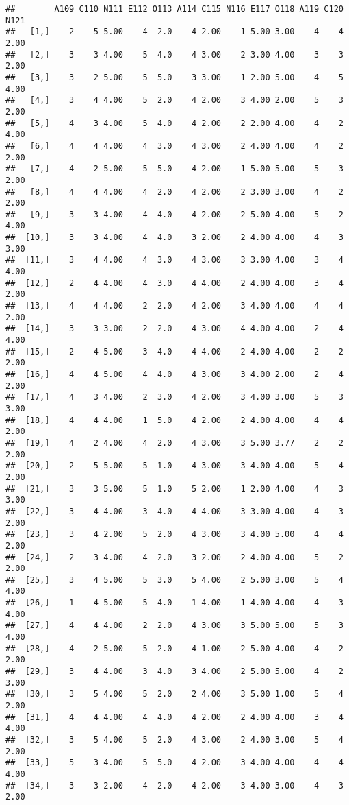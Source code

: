 \documentclass[]{article}
\begin{document}
\begin{verbatim}
##        A109 C110 N111 E112 O113 A114 C115 N116 E117 O118 A119 C120 N121
##   [1,]    2    5 5.00    4  2.0    4 2.00    1 5.00 3.00    4    4 2.00
##   [2,]    3    3 4.00    5  4.0    4 3.00    2 3.00 4.00    3    3 2.00
##   [3,]    3    2 5.00    5  5.0    3 3.00    1 2.00 5.00    4    5 4.00
##   [4,]    3    4 4.00    5  2.0    4 2.00    3 4.00 2.00    5    3 2.00
##   [5,]    4    3 4.00    5  4.0    4 2.00    2 2.00 4.00    4    2 4.00
##   [6,]    4    4 4.00    4  3.0    4 3.00    2 4.00 4.00    4    2 2.00
##   [7,]    4    2 5.00    5  5.0    4 2.00    1 5.00 5.00    5    3 2.00
##   [8,]    4    4 4.00    4  2.0    4 2.00    2 3.00 3.00    4    2 2.00
##   [9,]    3    3 4.00    4  4.0    4 2.00    2 5.00 4.00    5    2 4.00
##  [10,]    3    3 4.00    4  4.0    3 2.00    2 4.00 4.00    4    3 3.00
##  [11,]    3    4 4.00    4  3.0    4 3.00    3 3.00 4.00    3    4 4.00
##  [12,]    2    4 4.00    4  3.0    4 4.00    2 4.00 4.00    3    4 2.00
##  [13,]    4    4 4.00    2  2.0    4 2.00    3 4.00 4.00    4    4 2.00
##  [14,]    3    3 3.00    2  2.0    4 3.00    4 4.00 4.00    2    4 4.00
##  [15,]    2    4 5.00    3  4.0    4 4.00    2 4.00 4.00    2    2 2.00
##  [16,]    4    4 5.00    4  4.0    4 3.00    3 4.00 2.00    2    4 2.00
##  [17,]    4    3 4.00    2  3.0    4 2.00    3 4.00 3.00    5    3 3.00
##  [18,]    4    4 4.00    1  5.0    4 2.00    2 4.00 4.00    4    4 2.00
##  [19,]    4    2 4.00    4  2.0    4 3.00    3 5.00 3.77    2    2 2.00
##  [20,]    2    5 5.00    5  1.0    4 3.00    3 4.00 4.00    5    4 2.00
##  [21,]    3    3 5.00    5  1.0    5 2.00    1 2.00 4.00    4    3 3.00
##  [22,]    3    4 4.00    3  4.0    4 4.00    3 3.00 4.00    4    3 2.00
##  [23,]    3    4 2.00    5  2.0    4 3.00    3 4.00 5.00    4    4 2.00
##  [24,]    2    3 4.00    4  2.0    3 2.00    2 4.00 4.00    5    2 2.00
##  [25,]    3    4 5.00    5  3.0    5 4.00    2 5.00 3.00    5    4 4.00
##  [26,]    1    4 5.00    5  4.0    1 4.00    1 4.00 4.00    4    3 4.00
##  [27,]    4    4 4.00    2  2.0    4 3.00    3 5.00 5.00    5    3 4.00
##  [28,]    4    2 5.00    5  2.0    4 1.00    2 5.00 4.00    4    2 2.00
##  [29,]    3    4 4.00    3  4.0    3 4.00    2 5.00 5.00    4    2 3.00
##  [30,]    3    5 4.00    5  2.0    2 4.00    3 5.00 1.00    5    4 2.00
##  [31,]    4    4 4.00    4  4.0    4 2.00    2 4.00 4.00    3    4 4.00
##  [32,]    3    5 4.00    5  2.0    4 3.00    2 4.00 3.00    5    4 2.00
##  [33,]    5    3 4.00    5  5.0    4 2.00    3 4.00 4.00    4    4 4.00
##  [34,]    3    3 2.00    4  2.0    4 2.00    3 4.00 3.00    4    3 2.00

\end{verbatim}
\end{document}
